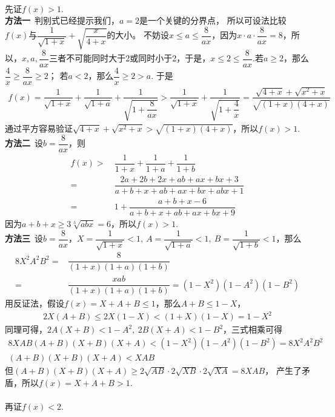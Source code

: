 \begin{enumerate}[label={【\textbf{例\thechapter.\arabic*}】},
 leftmargin=\inteval{\myenumleftmargin}pt,
 itemsep=\inteval{\myenumitempsep}pt,
 itemindent=\inteval{\myenumitemindent}pt]
\\
先证$ f(x)>1 $. \\
\textbf{方法一}\ 判别式已经提示我们，$ a=2 $是一个关键的分界点，
所以可设法比较$ f(x) $与$ \dfrac{1}{\sqrt{1+x}}+\sqrt{\dfrac{x}{4+x}} $的大小。
不妨设$ x\leq a\leq \dfrac{8}{ax} $，因为$ x\cdot a\cdot\dfrac{8}{ax}
=8 $，所以，$ x,a,\dfrac{8}{ax} $三者不可能同时大于2或同时小于2，于是，$ x\leq 2\leq \dfrac{8}{ax} $.若$ a\geq 2 $，那么$ \dfrac{4}{x}\geq \dfrac{8}{ax}\geq 2 $；
若$ a<2 $，那么$ \dfrac{4}{x}\geq 2>a $.
于是
\begin{align*}
    f(x)=\dfrac{1}{\sqrt{1+x}}+\dfrac{1}{\sqrt{1+a}}+\dfrac{1}{\sqrt{1
            +\dfrac{8}{ax}}} >\dfrac{1}{\sqrt{1+x}}+\dfrac{1}{\sqrt{1+\dfrac{4}{x}}} 
    =\dfrac{\sqrt{4+x}+\sqrt{x^2+x}}{\sqrt{(1+x)(4+x)}} 
\end{align*}
通过平方容易验证$ \sqrt{4+x}+\sqrt{x^2+x}>\sqrt{(1+x)(4+x)} $，所以$ f(x)>1 $.\\
\textbf{方法二}\ 设$ b=\dfrac{8}{ax} $，则
\begin{align*}
    f(x)>&\ \dfrac{1}{1+x}+\dfrac{1}{1+a}+\dfrac{1}{1+b} \\
    =&\ \dfrac{2a+2b+2x+ab+ax+bx+3}{a+b+x+ab+ax+bx+abx+1} \\
    =&\ 1+\dfrac{a+b+x-6}{a+b+x+ab+ax+bx+9}
\end{align*}
因为$ a+b+x\geq 3\sqrt[3]{abx}=6 $，所以$ f(x)>1 $. \\
\textbf{方法三}\ 设$ b=\dfrac{8}{ax} $，$ X=\dfrac{1}{\sqrt{1+x}}<1,
\ A=\dfrac{1}{\sqrt{1+a}}<1,\ B=\dfrac{1}{\sqrt{1+b}}<1 $，那么
\begin{align*}
    8X^2A^2B^2=&\dfrac{8}{(1+x)(1+a)(1+b)}\\
    =&\dfrac{xab}{(1+x)(1+a)(1+b)}=(1-X^2)(1-A^2)(1-B^2)
\end{align*}
用反证法，假设$ f(x)=X+A+B\leq 1 $，那么$ A+B\leq 1-X $，
\begin{align*}
    2X(A+B)\leq 2X(1-X)<(1+X)(1-X)=1-X^2
\end{align*}
同理可得，$ 2A(X+B)<1-A^2,\ 2B(X+A)<1-B^2 $，三式相乘可得
\begin{gather*}
    8XAB(A+B)(X+B)(X+A)<(1-X^2)(1-A^2)(1-B^2)=8X^2A^2B^2 \\
    (A+B)(X+B)(X+A)<XAB
\end{gather*}
但$ (A+B)(X+B)(X+A)\geq 2\sqrt{AB}\cdot 2\sqrt{XB}\cdot 2\sqrt{XA}=8XAB $，
产生了矛盾，所以$ f(x)=X+A+B>1 $.\\
\\
再证$ f(x)<2 $. \\

\end{enumerate}
